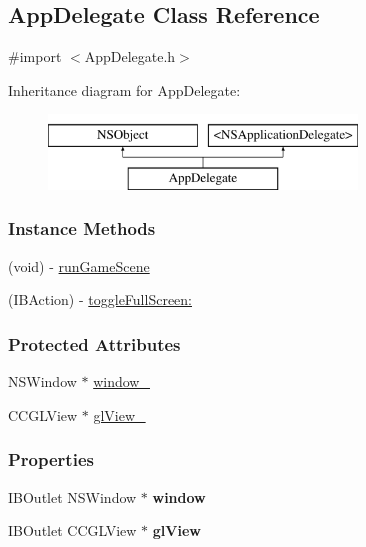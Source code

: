 \hypertarget{interface_app_delegate}{\subsection{App\-Delegate Class Reference}
\label{dd/d52/interface_app_delegate}
}


{\ttfamily \#import $<$App\-Delegate.\-h$>$}

Inheritance diagram for App\-Delegate\-:\begin{figure}[H]
\begin{center}
\leavevmode
\includegraphics[height=2.000000cm]{dd/d52/interface_app_delegate}
\end{center}
\end{figure}
\subsubsection*{Instance Methods}
\begin{DoxyCompactItemize}
\item 
(void) -\/ \hyperlink{interface_app_delegate_aa03ed24826ea60753de347b0ab33adfb}{run\-Game\-Scene}
\item 
(I\-B\-Action) -\/ \hyperlink{interface_app_delegate_ae9916ea37adae8d345a8008be3aa054f}{toggle\-Full\-Screen\-:}
\end{DoxyCompactItemize}
\subsubsection*{Protected Attributes}
\begin{DoxyCompactItemize}
\item 
N\-S\-Window $\ast$ \hyperlink{interface_app_delegate_a5338c82d195ce50c948cbbf1b974665b}{window\-\_\-}
\item 
C\-C\-G\-L\-View $\ast$ \hyperlink{interface_app_delegate_a5f256d1ae550f33820c6730d70088694}{gl\-View\-\_\-}
\end{DoxyCompactItemize}
\subsubsection*{Properties}
\begin{DoxyCompactItemize}
\item 
\hypertarget{interface_app_delegate_acdf10c46711b4d6a8d95def15620afb6}{I\-B\-Outlet N\-S\-Window $\ast$ {\bfseries window}}\label{dd/d52/interface_app_delegate_acdf10c46711b4d6a8d95def15620afb6}

\item 
\hypertarget{interface_app_delegate_aa68fb87b4f494cd1f0a0ef7d55590a17}{I\-B\-Outlet C\-C\-G\-L\-View $\ast$ {\bfseries gl\-View}}\label{dd/d52/interface_app_delegate_aa68fb87b4f494cd1f0a0ef7d55590a17}

\end{DoxyCompactItemize}


